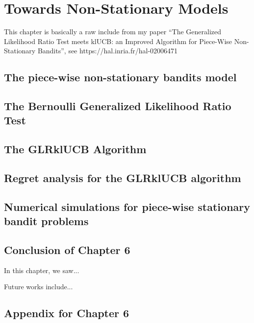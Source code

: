 

\chapter{Towards Non-Stationary Models}
\label{chapter:6}
\minitoc
\newpage
\graphicspath{{2-Chapters/6-Chapter/Images/}}

This chapter is basically a raw include from my paper ``The Generalized Likelihood Ratio Test meets klUCB: an Improved Algorithm for Piece-Wise Non-Stationary Bandits'', see https://hal.inria.fr/hal-02006471


\section{The piece-wise non-stationary bandits model}
\label{sec:6:piecewiseModel}


\section{The Bernoulli Generalized Likelihood Ratio Test}
\label{sec:6:piecewiseModel}


\section{The GLRklUCB Algorithm}
\label{sec:6:piecewiseModel}


\section{Regret analysis for the GLRklUCB algorithm}
\label{sec:6:piecewiseModel}


\section{Numerical simulations for piece-wise stationary bandit problems}
\label{sec:6:piecewiseModel}


\section{Conclusion of Chapter 6}
\label{sec:6:conclusion}

In this chapter, we saw...

Future works include...



\section{Appendix for Chapter 6}
\label{sec:6:appendix}

